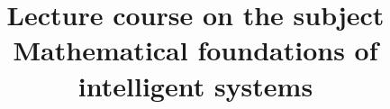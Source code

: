 \documentclass{beamer}
\begin{document}
\title{Lecture course on the subject\\ Mathematical foundations of intelligent systems}   


\begin{frame}
    \titlepage
\end{frame}

%
\begin{otherlanguage}{english}
%
\end{otherlanguage}
%
\begin{otherlanguage}{english}
%
\end{otherlanguage}
%
\begin{otherlanguage}{english}
%
\end{otherlanguage}
%
\begin{otherlanguage}{english}
	
\end{otherlanguage}
%
\begin{otherlanguage}{english}
%
\end{otherlanguage}
%
\begin{otherlanguage}{english}
%
\end{otherlanguage}
%
\begin{otherlanguage}{english}
%
\end{otherlanguage}
%
\begin{otherlanguage}{english}
%
\end{otherlanguage}
%
\begin{otherlanguage}{english}
%
\end{otherlanguage}
%
\begin{otherlanguage}{english}
%
\end{otherlanguage}
%
\begin{otherlanguage}{english}
%
\end{otherlanguage}
%
\begin{otherlanguage}{english}
%
\end{otherlanguage}
\end{document}

